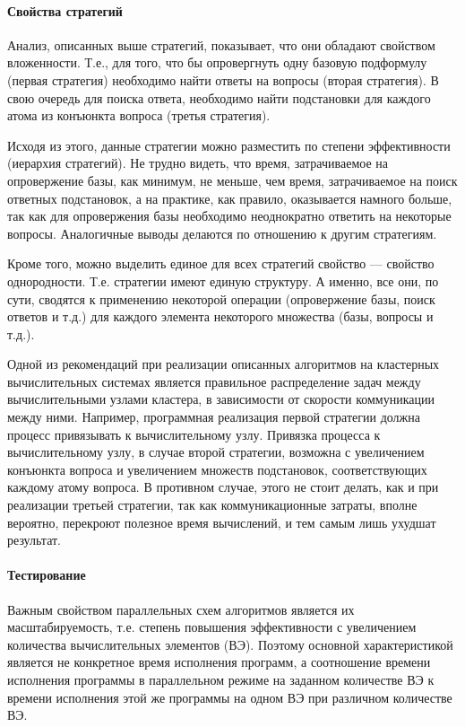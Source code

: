\paragraph{Свойства стратегий}

Анализ, описанных выше стратегий, показывает, что они обладают свойством вложенности. Т.е., для того, что бы опровергнуть одну базовую подформулу (первая стратегия) необходимо найти ответы на вопросы (вторая стратегия). В свою очередь для поиска ответа, необходимо найти подстановки для каждого атома из конъюнкта вопроса (третья стратегия).

Исходя из этого, данные стратегии можно разместить по степени эффективности (иерархия стратегий). Не трудно видеть, что время, затрачиваемое на опровержение базы, как минимум, не меньше, чем время, затрачиваемое на поиск ответных подстановок, а на практике, как правило, оказывается намного больше, так как для опровержения базы необходимо неоднократно ответить на некоторые вопросы. Аналогичные выводы делаются по отношению к другим стратегиям.

Кроме того, можно выделить единое для всех стратегий свойство –-- свойство однородности. Т.е. стратегии имеют единую структуру. А именно, все они, по сути, сводятся к применению некоторой операции (опровержение базы, поиск ответов и т.д.) для каждого элемента некоторого множества (базы, вопросы и т.д.).

Одной из рекомендаций при реализации описанных алгоритмов на кластерных вычислительных системах является правильное распределение задач между вычислительными узлами кластера, в зависимости от скорости коммуникации между ними. Например, программная реализация первой стратегии должна процесс привязывать к вычислительному узлу. Привязка процесса к вычислительному узлу, в случае второй стратегии, возможна с увеличением конъюнкта вопроса и увеличением множеств подстановок, соответствующих каждому атому вопроса. В противном случае, этого не стоит делать, как и  при реализации третьей стратегии, так как коммуникационные затраты, вполне вероятно, перекроют полезное время вычислений, и тем самым лишь ухудшат результат.


\paragraph{Тестирование}
Важным свойством параллельных схем алгоритмов является их масштабируемость, т.е. степень повышения эффективности с увеличением количества вычислительных элементов (ВЭ). Поэтому основной характеристикой является не конкретное время исполнения программ, а соотношение времени исполнения программы в параллельном режиме на заданном количестве ВЭ к времени исполнения этой же программы на одном ВЭ при различном количестве ВЭ.


